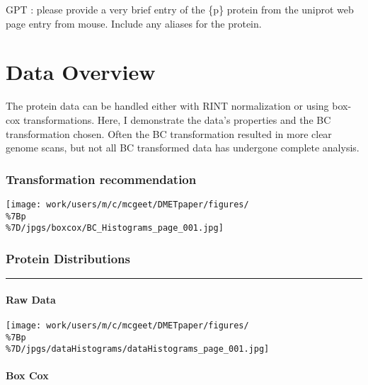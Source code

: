 \documentclass[
  letterpaper,
  DIV=11,
  numbers=noendperiod]{scrreprt}
\begin{document}
GPT : please provide a very brief entry of the \{p\} protein from the
uniprot web page entry from mouse. Include any aliases for the protein.


\chapter{Data Overview}\label{data-overview-2}

The protein data can be handled either with RINT normalization or using
box-cox transformations. Here, I demonstrate the data's properties and
the BC transformation chosen. Often the BC transformation resulted in
more clear genome scans, but not all BC transformed data has undergone
complete analysis.

\subsection{Transformation
recommendation}\label{transformation-recommendation-2}

\begin{center}
\texttt{[image: work/users/m/c/mcgeet/DMETpaper/figures/\\\%7Bp\\\%7D/jpgs/boxcox/BC\_Histograms\_page\_001.jpg]}
\end{center}

\subsection{Protein Distributions}\label{protein-distributions-2}

\begin{center}\rule{0.5\linewidth}{0.5pt}\end{center}

\subsubsection{Raw Data}\label{raw-data-1}

\begin{center}
\texttt{[image: work/users/m/c/mcgeet/DMETpaper/figures/\\\%7Bp\\\%7D/jpgs/dataHistograms/dataHistograms\_page\_001.jpg]}
\end{center}

\subsubsection{Box Cox}\label{box-cox-1}
\end{document}
